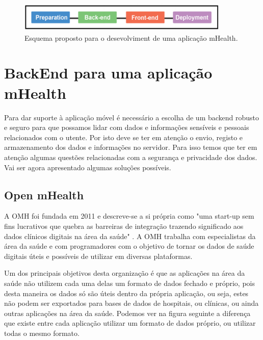 \documentclass[11pt,twoside,a4paper]{report}
\begin{document}
\begin{figure}[!ht]
  \centering
  \includegraphics[width=0.9\textwidth]{imgs/mhealthDevPipeline.png}
  \caption[Esquema proposto para o desevolvimento de uma aplica\c c\~ao mHealth]{Esquema proposto para o desevolviment de uma aplica\c c\~ao mHealth. \cite{mhealth-pipeline}}
  
  \label{f:mhealthpipeline}
\end{figure}

\section{BackEnd para uma aplicação mHealth}

Para dar suporte à aplicação móvel é necessário a escolha de um backend robusto e seguro para que possamos lidar com dados e informações sensíveis e pessoais relacionados com o utente. Por isto deve se ter em atenção o envio, registo e armazenamento dos dados e informações no servidor. Para isso temos que ter em atenção algumas questões relacionadas com a segurança e privacidade dos dados. Vai ser agora apresentado algumas soluções possíveis.

\subsection{Open mHealth}

A \gls{OMH} foi fundada em 2011 e descreve-se a si própria como "uma start-up sem fins lucrativos que quebra as barreiras de integração trazendo significado aos dados clínicos digitais na área da saúde" \cite{omhabout}. A \gls{OMH} trabalha com especialistas da área da saúde e com programadores com o objetivo de tornar os dados de saúde digitais úteis e possíveis de utilizar em diversas plataformas. 
\par 
Um dos principais objetivos desta organização é que as aplicações na área da saúde não utilizem cada uma delas um formato de dados fechado e próprio, pois desta maneira os dados só são úteis dentro da própria aplicação, ou seja, estes não podem ser exportados para bases de dados de hospitais, ou clínicas, ou ainda outras aplicações na área da saúde. Podemos ver na figura seguinte a diferença que existe entre cada aplicação utilizar um formato de dados próprio, ou utilizar todas o mesmo formato\cite{omharticle}.
\end{document}
